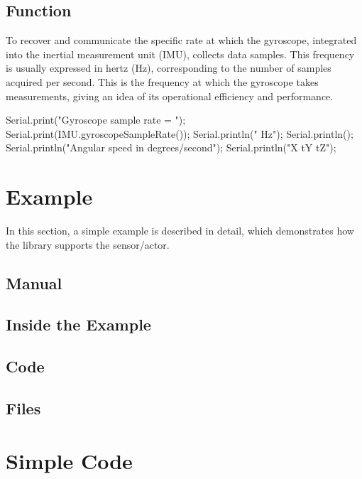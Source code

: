 \subsection{Function }

To recover and communicate the specific rate at which the gyroscope, integrated into the inertial measurement unit (IMU), collects data samples. This frequency is usually expressed in hertz (Hz), corresponding to the number of samples acquired per second. This is the frequency at which the gyroscope takes measurements, giving an idea of its operational efficiency and performance.

\begin{Arduino}
	Serial.print("Gyroscope sample rate = ");
	Serial.print(IMU.gyroscopeSampleRate());
	Serial.println(" Hz");
	Serial.println();
	Serial.println("Angular speed in degrees/second");
	Serial.println("X tY tZ");
	
\end{Arduino}


\section{Example}

In this section, a simple example is described in detail, which demonstrates how the library supports the sensor/actor.


\subsection{Manual}

\subsection{Inside the Example}

\subsection{Code}

\subsection{Files}



\section{Simple Code}


